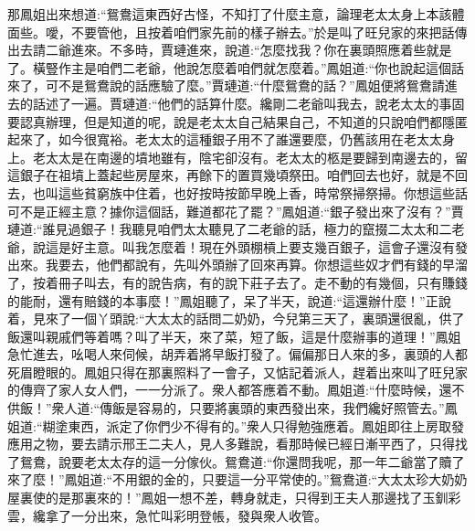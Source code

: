 \begin{parag}
    那鳳姐出來想道:“鴛鴦這東西好古怪，不知打了什麼主意，論理老太太身上本該體面些。噯，不要管他，且按着咱們家先前的樣子辦去。”於是叫了旺兒家的來把話傳出去請二爺進來。不多時，賈璉進來，說道:“怎麼找我？你在裏頭照應着些就是了。橫豎作主是咱們二老爺，他說怎麼着咱們就怎麼着。”鳳姐道:“你也說起這個話來了，可不是鴛鴦說的話應驗了麼。”賈璉道:“什麼鴛鴦的話？”鳳姐便將鴛鴦請進去的話述了一遍。賈璉道:“他們的話算什麼。纔剛二老爺叫我去，說老太太的事固要認真辦理，但是知道的呢，說是老太太自己結果自己，不知道的只說咱們都隱匿起來了，如今很寬裕。老太太的這種銀子用不了誰還要麼，仍舊該用在老太太身上。老太太是在南邊的墳地雖有，陰宅卻沒有。老太太的柩是要歸到南邊去的，留這銀子在祖墳上蓋起些房屋來，再餘下的置買幾頃祭田。咱們回去也好，就是不回去，也叫這些貧窮族中住着，也好按時按節早晚上香，時常祭掃祭掃。你想這些話可不是正經主意？據你這個話，難道都花了罷？”鳳姐道:“銀子發出來了沒有？”賈璉道:“誰見過銀子！我聽見咱們太太聽見了二老爺的話，極力的竄掇二太太和二老爺，說這是好主意。叫我怎麼着！現在外頭棚槓上要支幾百銀子，這會子還沒有發出來。我要去，他們都說有，先叫外頭辦了回來再算。你想這些奴才們有錢的早溜了，按着冊子叫去，有的說告病，有的說下莊子去了。走不動的有幾個，只有賺錢的能耐，還有賠錢的本事麼！”鳳姐聽了，呆了半天，說道:“這還辦什麼！”正說着，見來了一個丫頭說:“大太太的話問二奶奶，今兒第三天了，裏頭還很亂，供了飯還叫親戚們等着嗎？叫了半天，來了菜，短了飯，這是什麼辦事的道理！”鳳姐急忙進去，吆喝人來伺候，胡弄着將早飯打發了。偏偏那日人來的多，裏頭的人都死眉瞪眼的。鳳姐只得在那裏照料了一會子，又惦記着派人，趕着出來叫了旺兒家的傳齊了家人女人們，一一分派了。衆人都答應着不動。鳳姐道:“什麼時候，還不供飯！”衆人道:“傳飯是容易的，只要將裏頭的東西發出來，我們纔好照管去。”鳳姐道:“糊塗東西，派定了你們少不得有的。”衆人只得勉強應着。鳳姐即往上房取發應用之物，要去請示邢王二夫人，見人多難說，看那時候已經日漸平西了，只得找了鴛鴦，說要老太太存的這一分傢伙。鴛鴦道:“你還問我呢，那一年二爺當了贖了來了麼！”鳳姐道:“不用銀的金的，只要這一分平常使的。”鴛鴦道:“大太太珍大奶奶屋裏使的是那裏來的！”鳳姐一想不差，轉身就走，只得到王夫人那邊找了玉釧彩雲，纔拿了一分出來，急忙叫彩明登帳，發與衆人收管。
\end{parag}


